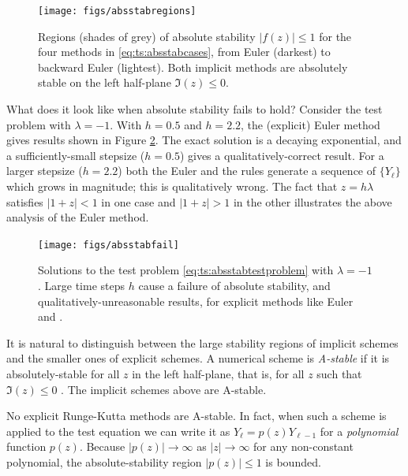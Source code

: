 \begin{figure}
\texttt{[image: figs/absstabregions]}
\caption{Regions (shades of grey) of absolute stability $|f(z)|\le 1$ for the four methods in \eqref{eq:ts:absstabcases}, from Euler (darkest) to backward Euler (lightest).  Both implicit methods are absolutely stable on the left half-plane $\Im(z)\le 0$.}
\label{fig:ts:absstabregions}
\end{figure}

What does it look like when absolute stability fails to hold?  Consider the test problem with $\lambda=-1$.  With $h=0.5$ and $h=2.2$, the (explicit) Euler method gives results shown in Figure \ref{fig:ts:absstabfail}.  The exact solution is a decaying exponential, and a sufficiently-small stepsize ($h=0.5$) gives a qualitatively-correct result.  For a larger stepsize ($h=2.2$) both the Euler and the \RKtwoa rules generate a sequence of $\{Y_\ell\}$ which grows in magnitude; this is qualitatively wrong.  The fact that $z=h\lambda$ satisfies $|1+z|<1$ in one case and $|1+z|>1$ in the other illustrates the above analysis of the Euler method.

\begin{figure}
\texttt{[image: figs/absstabfail]}
\caption{Solutions to the test problem \eqref{eq:ts:absstabtestproblem} with $\lambda=-1$.  Large time steps $h$ cause a failure of absolute stability, and qualitatively-unreasonable results, for explicit methods like Euler and \RKtwoa.}
\label{fig:ts:absstabfail}
\end{figure}

It is natural to distinguish between the large stability regions of implicit schemes and the smaller ones of explicit schemes.  A numerical scheme is \emph{A-stable} if it is absolutely-stable for all $z$ in the left half-plane, that is, for all $z$ such that $\Im(z)\le 0$ \citep{AscherPetzold1998}.  The implicit schemes above are A-stable.

No explicit Runge-Kutta methods are A-stable.  In fact, when such a scheme is applied to the test equation we can write it as $Y_\ell = p(z) Y_{\ell-1}$ for a \emph{polynomial} function $p(z)$.  Because $|p(z)|\to\infty$ as $|z|\to \infty$ for any non-constant polynomial, the absolute-stability region $|p(z)|\le 1$ is bounded.

